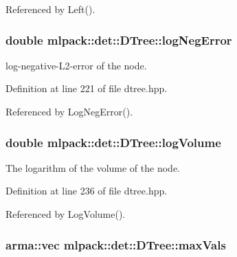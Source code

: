 Referenced by Left().

\subsubsection[{log\-Neg\-Error}]{\setlength{\rightskip}{0pt plus 5cm}double mlpack\-::det\-::\-D\-Tree\-::log\-Neg\-Error\hspace{0.3cm}{\ttfamily [private]}}\label{classmlpack_1_1det_1_1DTree_ace829ac2b00686e4deba51738abdc933}


log-\/negative-\/\-L2-\/error of the node. 



Definition at line 221 of file dtree.\-hpp.



Referenced by Log\-Neg\-Error().

\subsubsection[{log\-Volume}]{\setlength{\rightskip}{0pt plus 5cm}double mlpack\-::det\-::\-D\-Tree\-::log\-Volume\hspace{0.3cm}{\ttfamily [private]}}\label{classmlpack_1_1det_1_1DTree_af1e194fd1bc5b532a62d2fdca844f890}


The logarithm of the volume of the node. 



Definition at line 236 of file dtree.\-hpp.



Referenced by Log\-Volume().

\subsubsection[{max\-Vals}]{\setlength{\rightskip}{0pt plus 5cm}arma\-::vec mlpack\-::det\-::\-D\-Tree\-::max\-Vals\hspace{0.3cm}{\ttfamily [private]}}\label{classmlpack_1_1det_1_1DTree_ac5944ea68018a27fb01344afdbb60a73}


